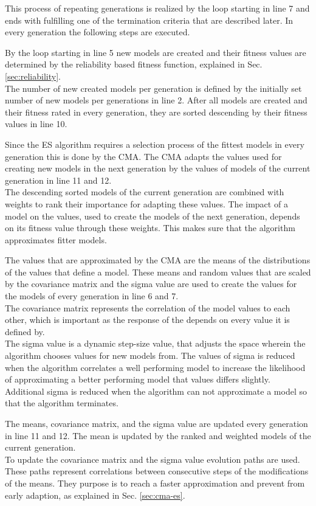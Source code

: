 This process of repeating generations is realized by the loop starting in line 7 and ends with fulfilling one of the termination criteria that are described later.
In every generation the following steps are executed.

By the loop starting in line 5 new models are created and their fitness values are determined by the reliability based fitness function, explained in Sec. \ref{sec:reliability}.\\
The number of new created models per generation is defined by the initially set number of new models per generations in line 2.
After all models are created and their fitness rated in every generation, they are sorted descending by their fitness values in line 10.

Since the \ac{ES} algorithm requires a selection process of the fittest models in every generation this is done by the \ac{CMA}.
The \ac{CMA} adapts the values used for creating new models in the next generation by the values of models of the current generation in line 11 and 12.\\
The descending sorted models of the current generation are combined with weights to rank their importance for adapting these values.
The impact of a model on the values, used to create the models of the next generation, depends on its fitness value through these weights.
This makes sure that the algorithm approximates fitter models.

The values that are approximated by the \ac{CMA} are the means of the distributions of the values that define a model.
These means and random values that are scaled by the covariance matrix and the sigma value are used to create the values for the models of every generation in line 6 and 7.\\
The covariance matrix represents the correlation of the model values to each other, which is important as the response of the \apuf depends on every value it is defined by.\\
The sigma value is a dynamic step-size value, that adjusts the space wherein the algorithm chooses values for new models from.
The values of sigma is reduced when the algorithm correlates a well performing model to increase the likelihood of approximating a better performing model that values differs slightly.\\
Additional sigma is reduced when the algorithm can not approximate a model so that the algorithm terminates.

The means, covariance matrix, and the sigma value are updated every generation in line 11 and 12.
The mean is updated by the ranked and weighted models of the current generation.\\
To update the covariance matrix and the sigma value evolution paths are used.
These paths represent correlations between consecutive steps of the modifications of the means. They purpose is to reach a faster approximation and prevent from early adaption, as explained in Sec. \ref{sec:cma-es}.


